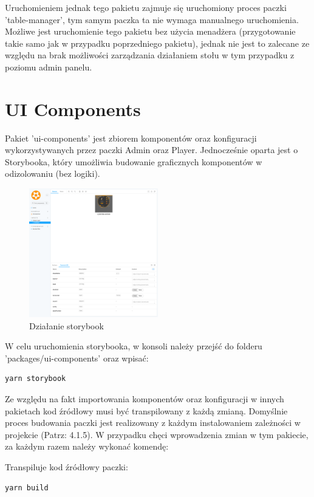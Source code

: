 Uruchomieniem jednak tego pakietu zajmuje się uruchomiony proces paczki 'table-manager', tym samym paczka ta nie wymaga manualnego uruchomienia. Możliwe jest uruchomienie tego pakietu bez użycia menadżera (przygotowanie takie samo jak w przypadku poprzedniego pakietu), jednak nie jest to zalecane ze względu na brak możliwości zarządzania działaniem stołu w tym przypadku z poziomu admin panelu.

\section{UI Components}
Pakiet 'ui-components' jest zbiorem komponentów oraz konfiguracji wykorzystywanych przez paczki Admin oraz Player. Jednocześnie oparta jest o Storybooka, który umożliwia budowanie graficznych komponentów w odizolowaniu (bez logiki).

\begin{figure}[h!]
  \centering
    \includegraphics[width=0.5\textwidth]{images/ui-components/storybook.png}
  \caption{Działanie storybook}
  \label{fig:mobile}
\end{figure}

W celu uruchomienia storybooka, w konsoli należy przejść do folderu 'packages/ui-components' oraz wpisać:

\begin{lstlisting}
yarn storybook
\end{lstlisting}

Ze względu na fakt importowania komponentów oraz konfiguracji w innych pakietach kod źródłowy musi być transpilowany z każdą zmianą. Domyślnie proces budowania paczki jest realizowany z każdym instalowaniem zależności w projekcie (Patrz: 4.1.5). W przypadku chęci wprowadzenia zmian w tym pakiecie, za każdym razem należy wykonać komendę:

Transpiluje kod źródłowy paczki:
\begin{lstlisting}
yarn build
\end{lstlisting}

